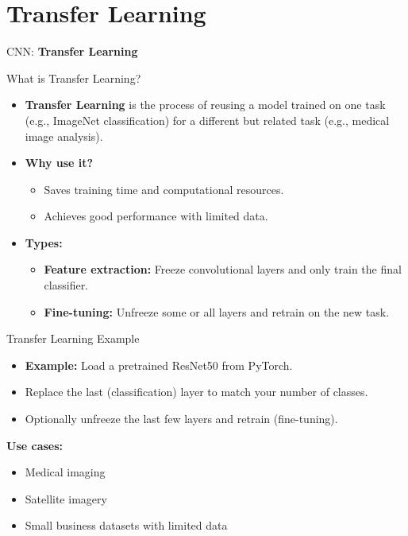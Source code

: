 \section{Transfer Learning}
\begin{frame}{}
    \LARGE CNN: \textbf{Transfer Learning}
\end{frame}

\begin{frame}{What is Transfer Learning?}
    \begin{itemize}
        \item \textbf{Transfer Learning} is the process of reusing a model trained on one task (e.g., ImageNet classification) for a different but related task (e.g., medical image analysis).
        \item \textbf{Why use it?}
        \begin{itemize}
            \item Saves training time and computational resources.
            \item Achieves good performance with limited data.
        \end{itemize}
        \item \textbf{Types:}
        \begin{itemize}
            \item \textbf{Feature extraction:} Freeze convolutional layers and only train the final classifier.
            \item \textbf{Fine-tuning:} Unfreeze some or all layers and retrain on the new task.
        \end{itemize}
    \end{itemize}
\end{frame}

\begin{frame}{Transfer Learning Example}
    \begin{itemize}
        \item \textbf{Example:} Load a pretrained ResNet50 from PyTorch.
        \item Replace the last (classification) layer to match your number of classes.
        \item Optionally unfreeze the last few layers and retrain (fine-tuning).
    \end{itemize}
    \vspace{0.5cm}
    \textbf{Use cases:}
    \begin{itemize}
        \item Medical imaging
        \item Satellite imagery
        \item Small business datasets with limited data
    \end{itemize}
\end{frame}

